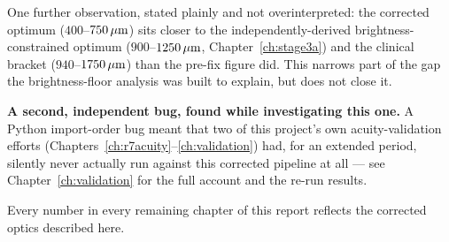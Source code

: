 One further observation, stated plainly and not overinterpreted: the corrected optimum
($400$--$750\,\mu\text{m}$) sits closer to the independently-derived brightness-constrained
optimum ($900$--$1250\,\mu\text{m}$, Chapter~\ref{ch:stage3a}) and the clinical bracket
($940$--$1750\,\mu\text{m}$) than the pre-fix figure did. This narrows part of the gap the
brightness-floor analysis was built to explain, but does not close it.

\textbf{A second, independent bug, found while investigating this one.} A Python
import-order bug meant that two of this project's own acuity-validation efforts
(Chapters~\ref{ch:r7acuity}--\ref{ch:validation}) had, for an extended period, silently
never actually run against this corrected pipeline at all --- see
Chapter~\ref{ch:validation} for the full account and the re-run results.

Every number in every remaining chapter of this report reflects the corrected optics
described here.
